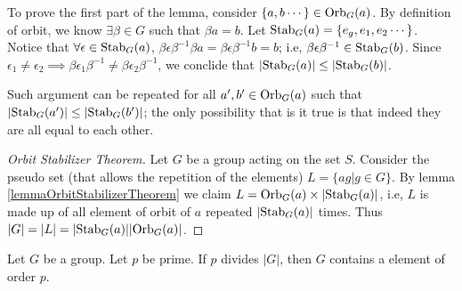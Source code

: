 \documentclass[../note.tex]{subfiles}
\begin{document}
To prove the first part of the lemma, consider $\{a,b \cdots\}\in \text{Orb}_{G}({a})$. By definition of orbit, we know $\exists \beta \in G $ such that $\beta a = b$.
Let $\text{Stab}_{G}({a}) = \{e_g, e_1, e_2 \cdots\}$. Notice that $\forall \epsilon \in \text{Stab}_{G}({a})$, $\beta \epsilon \beta^{-1} \beta a = \beta \epsilon \beta^{-1} b = b$; i.e, $\beta \epsilon \beta^{-1} \in \text{Stab}_{G}({b})$. 
Since $\epsilon_1 \neq \epsilon_2 \implies \beta \epsilon_1 \beta^{-1} \neq \beta \epsilon_2 \beta ^{-1}$, we conclide that $|\text{Stab}_{G}({a})| \leq |\text{Stab}_{G}({b})| $.

Such argument can be repeated for all $a',b' \in \text{Orb}_{G}({a})$ such that $|\text{Stab}_{G}({a'})| \leq |\text{Stab}_{G}({b'})|$; the only possibility that is it true is that indeed they are all equal to each other.

\begin{proof}[Orbit Stabilizer Theorem]
	Let $G$ be a group acting on the set $S$. 
	Consider the pseudo set (that allows the repetition of the elements) $L=\{ag| g\in G\}$. 
	By lemma \ref{lemmaOrbitStabilizerTheorem} we claim $L=\text{Orb}_{G}({a}) \times |\text{Stab}_{G}({a})|$, i.e, $L$ is made up of all element of orbit of $a$ repeated $|\text{Stab}_{G}({a})|$ times. Thus $|G|=|L|=|\text{Stab}_{G}({a})||\text{Orb}_{G}({a})|$.
\end{proof}

\begin{theorem}
	Let $G$ be a group. Let $p$ be prime. If $p$ divides $|G|$, then $G$ contains a element of order $p$.
\end{theorem}
\end{document}
